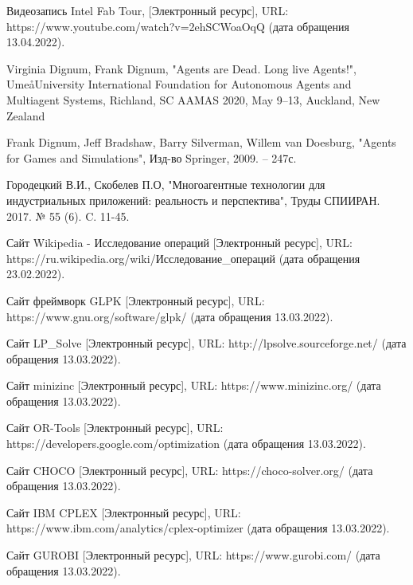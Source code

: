 \begingroup 
\renewcommand{\section}[2]{\anonsection{Список использованных источников (старый)}}
\begin{thebibliography}{00}
	Видеозапись Intel Fab Tour,
	[Электронный ресурс],
	URL: https://www.youtube.com/watch?v=2ehSCWoaOqQ
	(дата обращения 13.04.2022).

    Virginia Dignum, Frank Dignum,
    "Agents are Dead. Long live Agents!",
    UmeåUniversity
    International Foundation for Autonomous Agents and Multiagent Systems, Richland, SC
    AAMAS 2020, May 9–13, Auckland, New Zealand
    
	Frank Dignum, Jeff Bradshaw, Barry Silverman, Willem van Doesburg,
    "Agents for Games and Simulations",
    Изд-во Springer, 2009. -- 247с.

	Городецкий В.И., Скобелев П.О,
    "Многоагентные технологии для индустриальных приложений: реальность и перспектива",
    Труды СПИИРАН. 2017. № 55 (6). C. 11-45.
    
	Сайт Wikipedia - Исследование операций
    [Электронный ресурс],
    URL: https://ru.wikipedia.org/wiki/Исследование\_операций
    (дата обращения 23.02.2022).
	

	Сайт фреймворк GLPK
	[Электронный ресурс],
	URL: https://www.gnu.org/software/glpk/
	(дата обращения 13.03.2022).
    
    Сайт LP\_Solve
    [Электронный ресурс],
    URL: http://lpsolve.sourceforge.net/
    (дата обращения 13.03.2022).

    Сайт minizinc
    [Электронный ресурс],
    URL: https://www.minizinc.org/
    (дата обращения 13.03.2022).

    Сайт OR-Tools
    [Электронный ресурс],
    URL: https://developers.google.com/optimization
    (дата обращения 13.03.2022).

    Сайт CHOCO
    [Электронный ресурс],
    URL: https://choco-solver.org/
    (дата обращения 13.03.2022).
	
    Сайт IBM CPLEX
    [Электронный ресурс],
    URL: https://www.ibm.com/analytics/cplex-optimizer
    (дата обращения 13.03.2022).

    Сайт GUROBI
    [Электронный ресурс],
    URL: https://www.gurobi.com/
    (дата обращения 13.03.2022).
   

\end{thebibliography}
